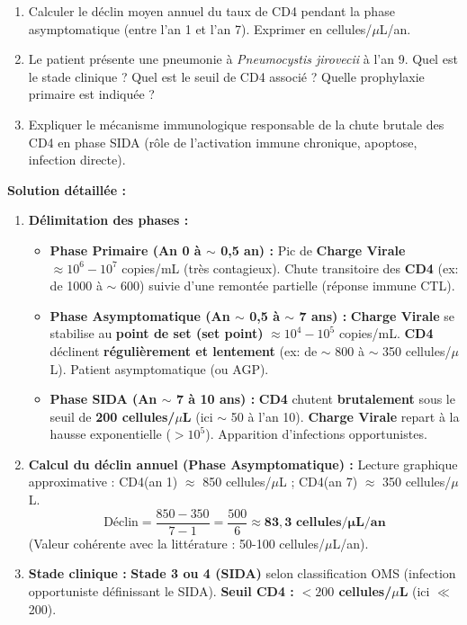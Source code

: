 \documentclass[11pt]{article}
\begin{document}
\begin{exoresolu}
\begin{enumerate}
    \item Calculer le déclin moyen annuel du taux de CD4 pendant la phase asymptomatique (entre l'an 1 et l'an 7). Exprimer en cellules/$\mu$L/an.
    \item Le patient présente une pneumonie à \emph{Pneumocystis jirovecii} à l'an 9. Quel est le stade clinique ? Quel est le seuil de CD4 associé ? Quelle prophylaxie primaire est indiquée ?
    \item Expliquer le mécanisme immunologique responsable de la chute brutale des CD4 en phase SIDA (rôle de l'activation immune chronique, apoptose, infection directe).
\end{enumerate}
\tcblower
\textbf{Solution détaillée :}
\begin{enumerate}
    \item \textbf{Délimitation des phases :}
    \begin{itemize}
        \item \textbf{Phase Primaire (An 0 à $\sim$ 0,5 an) :} Pic de \textbf{Charge Virale} $\approx 10^6 - 10^7$ copies/mL (très contagieux). Chute transitoire des \textbf{CD4} (ex: de 1000 à $\sim$ 600) suivie d'une remontée partielle (réponse immune CTL).
        \item \textbf{Phase Asymptomatique (An $\sim$ 0,5 à $\sim$ 7 ans) :} \textbf{Charge Virale} se stabilise au \textbf{point de set (set point)} $\approx 10^4 - 10^5$ copies/mL. \textbf{CD4} déclinent \textbf{régulièrement et lentement} (ex: de $\sim$ 800 à $\sim$ 350 cellules/$\mu$L). Patient asymptomatique (ou AGP).
        \item \textbf{Phase SIDA (An $\sim$ 7 à 10 ans) :} \textbf{CD4} chutent \textbf{brutalement} sous le seuil de \textbf{200 cellules/$\mu$L} (ici $\sim$ 50 à l'an 10). \textbf{Charge Virale} repart à la hausse exponentielle ($> 10^5$). Apparition d'infections opportunistes.
    \end{itemize}
    \item \textbf{Calcul du déclin annuel (Phase Asymptomatique) :}
    Lecture graphique approximative : CD4(an 1) $\approx$ 850 cellules/$\mu$L ; CD4(an 7) $\approx$ 350 cellules/$\mu$L.
    \[
    \text{Déclin} = \frac{850 - 350}{7 - 1} = \frac{500}{6} \approx \mathbf{83,3 \text{ cellules/$\mu$L/an}}
    \]
    (Valeur cohérente avec la littérature : 50-100 cellules/$\mu$L/an).
    \item \textbf{Stade clinique :} \textbf{Stade 3 ou 4 (SIDA)} selon classification OMS (infection opportuniste définissant le SIDA).
    \textbf{Seuil CD4 :} \textbf{$< 200$ cellules/$\mu$L} (ici $\ll$ 200).

\end{enumerate}
\end{exoresolu}
\end{document}
